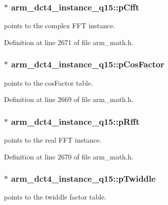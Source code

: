 \hypertarget{structarm__dct4__instance__q15_a7284932ee8c36107c33815eb62eadffc}{
\subsubsection[{p\-Cfft}]{$\ast$ arm\-\_\-dct4\-\_\-instance\-\_\-q15\-::p\-Cfft}}\label{structarm__dct4__instance__q15_a7284932ee8c36107c33815eb62eadffc}
points to the complex F\-F\-T instance. 

Definition at line 2671 of file arm\-\_\-math.\-h.

\hypertarget{structarm__dct4__instance__q15_ac76df681b1bd502fb4874c06f055dded}{
\subsubsection[{p\-Cos\-Factor}]{$\ast$ arm\-\_\-dct4\-\_\-instance\-\_\-q15\-::p\-Cos\-Factor}}\label{structarm__dct4__instance__q15_ac76df681b1bd502fb4874c06f055dded}
points to the cos\-Factor table. 

Definition at line 2669 of file arm\-\_\-math.\-h.

\hypertarget{structarm__dct4__instance__q15_a11cf95c1cd9dd2dd5e4b81b8f88dc208}{
\subsubsection[{p\-Rfft}]{$\ast$ arm\-\_\-dct4\-\_\-instance\-\_\-q15\-::p\-Rfft}}\label{structarm__dct4__instance__q15_a11cf95c1cd9dd2dd5e4b81b8f88dc208}
points to the real F\-F\-T instance. 

Definition at line 2670 of file arm\-\_\-math.\-h.

\hypertarget{structarm__dct4__instance__q15_abc6c847e9f906781e1d5da40e9aafa76}{
\subsubsection[{p\-Twiddle}]{$\ast$ arm\-\_\-dct4\-\_\-instance\-\_\-q15\-::p\-Twiddle}}\label{structarm__dct4__instance__q15_abc6c847e9f906781e1d5da40e9aafa76}
points to the twiddle factor table. 

